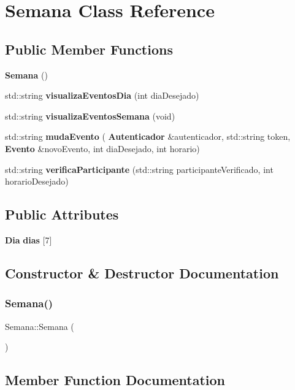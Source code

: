 \section{Semana Class Reference}
\label{class_semana}
\subsection*{Public Member Functions}
\begin{DoxyCompactItemize}
\item 
\textbf{ Semana} ()
\item 
std\+::string \textbf{ visualiza\+Eventos\+Dia} (int dia\+Desejado)
\item 
std\+::string \textbf{ visualiza\+Eventos\+Semana} (void)
\item 
std\+::string \textbf{ muda\+Evento} (\textbf{ Autenticador} \&autenticador, std\+::string token, \textbf{ Evento} \&novo\+Evento, int dia\+Desejado, int horario)
\item 
std\+::string \textbf{ verifica\+Participante} (std\+::string participante\+Verificado, int horario\+Desejado)
\end{DoxyCompactItemize}
\subsection*{Public Attributes}
\begin{DoxyCompactItemize}
\item 
\textbf{ Dia} \textbf{ dias} [7]
\end{DoxyCompactItemize}


\subsection{Constructor \& Destructor Documentation}
\mbox{\label{class_semana_a97033534bccf3ba55f2f82bb3723437a}} 
\subsubsection{Semana()}
{\footnotesize\ttfamily Semana\+::\+Semana (\begin{DoxyParamCaption}{ }\end{DoxyParamCaption})\hspace{0.3cm}{\ttfamily [inline]}}



\subsection{Member Function Documentation}
\mbox{\label{class_semana_ae275174a2082938ed9a859f38f0701d6}} 
